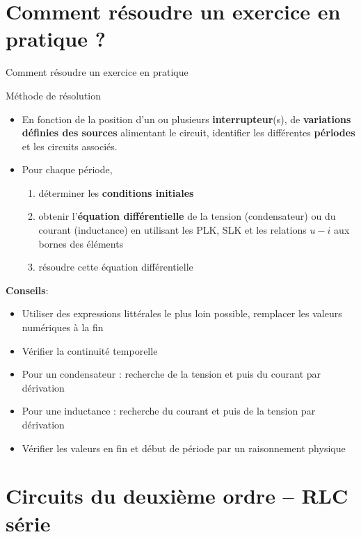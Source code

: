 \section{Comment résoudre un exercice en pratique ?}
\begin{frame}[allowframebreaks]{Comment résoudre un exercice en pratique}
	\begin{block} {Méthode de résolution}
		\begin{itemize}
			\item En fonction de la position d'un ou plusieurs \textbf{interrupteur}(s), de {\bf variations définies des sources} alimentant le circuit, identifier les différentes \textbf{périodes} et les circuits associés.
			\item Pour chaque période,
			\begin{enumerate}
				\item déterminer les \textbf{conditions initiales}
				\item obtenir l'\textbf{équation différentielle} de la tension (condensateur) ou du courant (inductance) en utilisant les PLK, SLK et les relations $u-i$ aux bornes des éléments
				\item résoudre cette équation différentielle
			\end{enumerate}
		\end{itemize}
	\end{block}	

\newpage
\textbf{Conseils}:
\begin{itemize}
  \item Utiliser des expressions littérales le plus loin possible, remplacer les valeurs numériques à la fin
  \item Vérifier la continuité temporelle
  \item Pour un condensateur : recherche de la tension et puis du courant par dérivation
  \item Pour une inductance : recherche du courant et puis de la tension par dérivation
  \item Vérifier les valeurs en fin et début de période par un raisonnement physique
\end{itemize}
\end{frame}


\section{Circuits du deuxième ordre -- RLC série}

